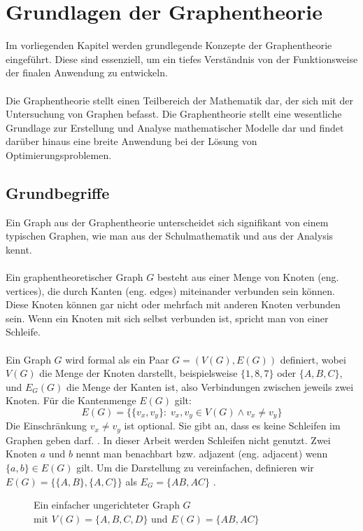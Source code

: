 \newpage
\section{Grundlagen der Graphentheorie}
Im vorliegenden Kapitel werden grundlegende Konzepte der Graphentheorie eingeführt. 
Diese sind essenziell, um ein tiefes Verständnis von der Funktionsweise der finalen Anwendung zu entwickeln.\\\\
Die Graphentheorie stellt einen Teilbereich der Mathematik dar, der sich mit der Untersuchung von Graphen befasst. 
Die Graphentheorie stellt eine wesentliche Grundlage zur Erstellung und Analyse mathematischer Modelle dar und findet darüber hinaus eine breite Anwendung bei der Lösung von Optimierungsproblemen.
\subsection{Grundbegriffe}
Ein Graph aus der Graphentheorie unterscheidet sich signifikant von einem \glqq typischen\grqq \; Graphen, wie man aus der Schulmathematik und aus der Analysis kennt.\\\\
Ein graphentheoretischer Graph $G$ besteht aus einer Menge von Knoten (\acrshort{eng.} vertices), die durch Kanten (\acrshort{eng.} edges) miteinander verbunden sein können. 
Diese Knoten können gar nicht oder mehrfach mit anderen Knoten verbunden sein. 
Wenn ein Knoten mit sich selbst verbunden ist, spricht man von einer Schleife. \\\\
Ein Graph $G$ wird formal als ein Paar $G = (V(G), E(G))$ definiert, wobei \(V(G)\) die Menge der Knoten darstellt, beispielsweise \(\{1, 8, 7\}\) oder \(\{A, B, C\}\), und \(E_G(G)\) die Menge der Kanten ist, also Verbindungen zwischen jeweils zwei Knoten.
Für die Kantenmenge \(E(G)\) gilt: 
\begin{equation*}
    E(G) = \{\{v_x, v_y\} \colon \; v_x, v_y \in V(G) \wedge v_x \neq v_y\}
\end{equation*}
Die Einschränkung $v_x\neq v_y$ ist optional.
Sie gibt an, dass es keine Schleifen im Graphen geben darf. \parencite[2]{Diestel2017-bj}.
In dieser Arbeit werden Schleifen nicht genutzt. Zwei Knoten $a$ und $b$ nennt man benachbart \acrshort{bzw.} adjazent (\acrshort{eng.} adjacent) wenn $\{a,b\} \in E(G)$ gilt. 
Um die Darstellung zu vereinfachen, definieren wir $E(G) = \{\{A,B\},\{A,C\}\}$ als $E_G = \{AB, AC\}$ \parencite[3]{Diestel2017-bj}.
\begin{figure}[H]
    \centering
    
    \caption[Einfacher ungerichteter Graph]{Ein einfacher ungerichteter Graph $G$ \\ mit $V(G)=\{A,B,C,D\}$ und $E(G)=\{{AB, AC}\}$ }
    \label{g1}
\end{figure}
